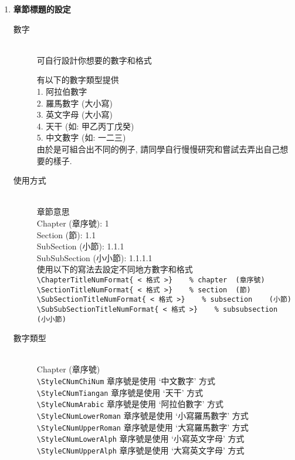 \begin{enumerate}
  \item
  {
    \textbf{章節標題的設定}

    \begin{description}

    \item [數字]\hfill\\
        可自行設計你想要的數字和格式

        有以下的數字類型提供\\
            1. 阿拉伯數字\\
            2. 羅馬數字 (大小寫)\\
            3. 英文字母  (大小寫)\\
            4. 天干 (如: 甲乙丙丁戊癸)\\
            5. 中文數字 (如: 一二三)\\

        由於是可組合出不同的例子,  請同學自行慢慢研究和嘗試去弄出自己想要的樣子.

    \item [使用方式]\hfill\\
        章節意思\\
        Chapter (章序號): 1\\
        Section (節): 1.1\\
        SubSection (小節): 1.1.1\\
        SubSubSection (小小節): 1.1.1.1\\

        使用以下的寫法去設定不同地方數字和格式\\
            \verb|\ChapterTitleNumFormat{ < 格式 >}    % chapter 	(章序號)|\\
            \verb|\SectionTitleNumFormat{ < 格式 >}    % section 	(節)|\\
            \verb|\SubSectionTitleNumFormat{ < 格式 >}    % subsection 	(小節)|\\
            \verb|\SubSubSectionTitleNumFormat{ < 格式 >}    % subsubsection 	(小小節)|

    \item [數字類型]\hfill\\
     Chapter (章序號)\\
        \verb|\StyleCNumChiNum| 章序號是使用 `中文數字' 方式\\
        \verb|\StyleCNumTiangan| 章序號是使用 `天干' 方式\\
        \verb|\StyleCNumArabic| 章序號是使用 `阿拉伯數字' 方式\\
        \verb|\StyleCNumLowerRoman| 章序號是使用 `小寫羅馬數字' 方式\\
        \verb|\StyleCNumUpperRoman| 章序號是使用 `大寫羅馬數字' 方式\\
        \verb|\StyleCNumLowerAlph| 章序號是使用 `小寫英文字母' 方式\\
        \verb|\StyleCNumUpperAlph| 章序號是使用 `大寫英文字母' 方式


\end{description}}
\end{enumerate}
